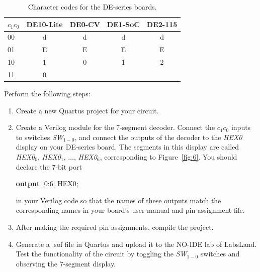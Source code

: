 \documentclass[epsfig,10pt,fullpage]{article}
\begin{document}
\begin{table}[H]
	\begin{center}
	\begin{tabular}{l | c | c | c | c}
	$c_1 c_0$ & DE10-Lite & DE0-CV & DE1-SoC & DE2-115 \\
	\hline
	{\rule[0mm]{0mm}{5mm}\hspace{0.75 mm} 00} & d & d & d & d \\
	\hspace{0.75 mm}
	01 & E & E & E & E \\
	\hspace{0.75 mm}
	10 & 1 & 0 & 1 & 2 \\
	\hspace{0.75 mm}
	11 & 0 & & & \\
	\end{tabular}
	\caption{Character codes for the DE-series boards.}
	\label{tab:codes}
	\end{center}
\end{table}

Perform the following steps:

\begin{enumerate}
\item Create a new Quartus project for your circuit.
\item Create a Verilog module for the 7-segment decoder. Connect the $c_1 c_0$ inputs
to switches {\it SW}$_{1-0}$, and connect the outputs of the decoder to the {\it HEX0} 
display on your DE-series board. The segments in this display are called 
{\it HEX0}$_0$, {\it HEX0}$_1$, $\ldots$, {\it HEX0}$_6$, corresponding to  Figure~\ref{fig:6}.
You should declare the 7-bit port 

\begin{center}
\begin{minipage}[t]{12.5 cm}
\begin{tabbing}
{\bf output} [0:6] HEX0;
\end{tabbing}
\end{minipage}
\end{center}

in your Verilog code so that the
names of these outputs match the corresponding names in your board's user manual and pin assignment file.
\item After making the required pin assignments, compile the project.
\item Generate a .sof file in Quartus and upload it to the NO-IDE lab of LabsLand. Test the functionality of the 
circuit by toggling the {\it SW}$_{1-0}$ switches and observing the 7-segment display.
\end{enumerate}
\end{document}
